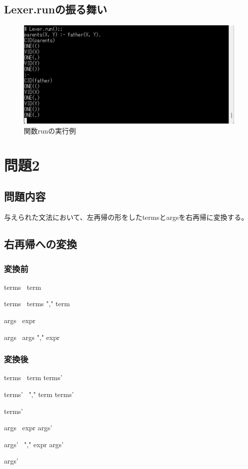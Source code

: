 \documentclass{ltjsarticle}
\begin{document}
\subsection{Lexer.runの振る舞い}
\begin{figure}[htbp]
  \centering
  \caption{関数runの実行例}
  \label{fig:lexer_run}
  \includegraphics[scale = 0.6]{lexer_run.png}
\end{figure}

\section{問題2}
\subsection{問題内容}
与えられた文法において、左再帰の形をしたtermsとargsを右再帰に変換する。
\subsection{右再帰への変換}
\subsubsection{変換前}
terms \rightarrow \ term\par
terms \rightarrow \ terms "," term\par
args \rightarrow \ expr\par
args \rightarrow \ args "," expr\par


\subsubsection{変換後}
terms \rightarrow \ term terms'\par
terms' \rightarrow \ "," term terms'\par
terms' \rightarrow \ \par
args \rightarrow \ expr args'\par
args' \rightarrow \ "," expr args'\par
args' \rightarrow \par
\end{document}
